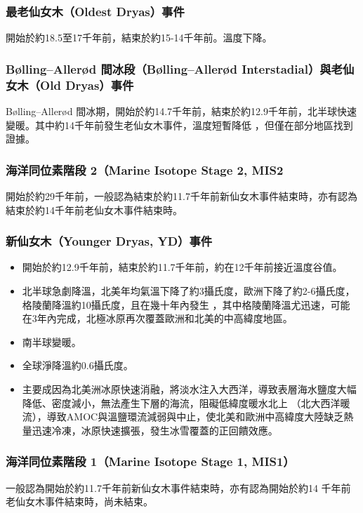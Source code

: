 \documentclass[a4paper,12pt]{report}
\begin{document}
\subsubsection{最老仙女木（Oldest Dryas）事件}
開始於約18.5至17千年前，結束於約15-14千年前。溫度下降。
\subsubsection{Bølling–Allerød 間冰段（Bølling–Allerød Interstadial）與老仙女木（Old Dryas）事件}
Bølling–Allerød 間冰期，開始於約14.7千年前，結束於約12.9千年前，北半球快速變暖。其中約14千年前發生老仙女木事件，溫度短暫降低 ，但僅在部分地區找到證據。
\subsubsection{海洋同位素階段 2（Marine Isotope Stage 2, MIS2 }
開始於約29千年前，一般認為結束於約11.7千年前新仙女木事件結束時，亦有認為結束於約14千年前老仙女木事件結束時。
\subsubsection{新仙女木（Younger Dryas, YD）事件}
\begin{itemize}
\item 開始於約12.9千年前，結束於約11.7千年前，約在12千年前接近溫度谷值。
\item 北半球急劇降溫，北美年均氣溫下降了約3攝氏度，歐洲下降了約2-6攝氏度，格陵蘭降溫約10攝氏度，且在幾十年內發生 ，其中格陵蘭降溫尤迅速，可能在3年內完成，北極冰原再次覆蓋歐洲和北美的中高緯度地區。
\item 南半球變暖。
\item 全球淨降溫約0.6攝氏度。
\item 主要成因為北美洲冰原快速消融，將淡水注入大西洋，導致表層海水鹽度大幅降低、密度減小，無法產生下層的海流，阻礙低緯度暖水北上 （北大西洋暖流），導致AMOC與溫鹽環流減弱與中止，使北美和歐洲中高緯度大陸缺乏熱量迅速冷凍，冰原快速擴張，發生冰雪覆蓋的正回饋效應。
\end{itemize}
\subsubsection{海洋同位素階段 1（Marine Isotope Stage 1, MIS1）}
一般認為開始於約11.7千年前新仙女木事件結束時，亦有認為開始於約14 千年前老仙女木事件結束時，尚未結束。
\end{document}
